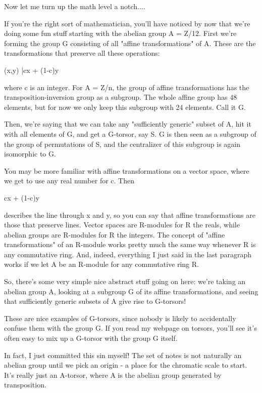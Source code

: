 Now let me turn up the math level a notch....

If you're the right sort of mathematician, you'll have noticed by
now that we're doing some fun stuff starting with the abelian
group A = Z/12.   First we're forming the group G consisting of all
"affine transformations" of A.  These are the transformations that 
preserve all these operations:

(x,y) |\to  cx + (1-c)y                

where c is an integer.   For A = Z/n, the group of affine
transformations has the transposition-inversion group as a
subgroup.  The whole affine group has 48 elements, but for 
now we only keep this subgroup with 24 elements.  Call it G.


Then, we're saying that we can take any "sufficiently generic" 
subset of A, hit it with all elements of G, and get a G-torsor, 
say S.  G is then seen as a subgroup of the group of permutations 
of S, and the centralizer of this subgroup is again isomorphic to 
G.

You may be more familiar with affine transformations on a vector 
space, where we get to use any real number for c.   Then 

cx + (1-c)y       

describes the line through x and y, so you can say that affine 
transformations are those that preserve lines.  Vector spaces are 
R-modules for R the reals, while abelian groups are R-modules for 
R the integers.  The concept of "affine transformations" of an 
R-module works pretty much the same way whenever R is any 
commutative ring.   And, indeed, everything I just said in the last
paragraph works if we let A be an R-module for any commutative ring 
R.   

So, there's some very simple nice abstract stuff going on here:
we're taking an abelian group A, looking at a subgroup G of its
affine transformations, and seeing that sufficiently generic
subsets of A give rise to G-torsors!

These are nice examples of G-torsors, since nobody is likely to 
accidentally confuse them with the group G.  If you read my webpage
on torsors, you'll see it's often easy to mix up a G-torsor with 
the group G itself.

In fact, I just committed this sin myself!   The set of notes is 
not naturally an abelian group until we pick an origin - a place 
for the chromatic scale to start.  It's really just an A-torsor, 
where A is the abelian group generated by transposition.  

